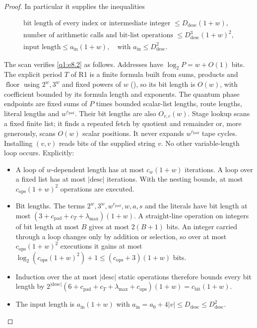 \begin{proof}
In particular it supplies the inequalities

\begin{equation}\label{q1:e8.2}
\begin{gathered}
\text{bit length of every index or intermediate integer }\le  D_{\mathrm{desc}}(1+w), \\ \text{number of arithmetic calls and bit-list operations }\le  D_{\mathrm{desc}}^{3}(1+w)^{2}, \\ \text{input length} \le  a_{\mathrm{in}}(1+w),\quad\text{with } a_{\mathrm{in}}\le D_{\mathrm{desc}}^{2}.
\end{gathered}
\end{equation}

The scan verifies \eqref{q1:e8.2} as follows. Addresses have \(\log _{2} P=w+O(1)\) bits. The explicit period \(T\) of R1 is a finite formula built from sums, products and \(\operatorname{floor}\) using \(2^{w},3^{w}\) and fixed powers of \(w\) (\cite[Section~\ref*{cl:sec:clock} and Appendix~\ref*{cl:sec:constants}]{DMNoise1D2026}), so its bit length is \(O(w)\), with coefficient bounded by its formula length and exponents. The quantum phase endpoints are fixed sums of \(P\) times bounded scalar-list lengths, route lengths, literal lengths and \(w^{c_{\mathrm{pad}}}\). Their bit lengths are also \(O_{v,c}(w)\). Stage lookup scans a fixed finite list; it finds a repeated fetch by quotient and remainder or, more generously, scans \(O(w)\) scalar positions. It never expands \(w^{c_{\mathrm{pad}}}\) tape cycles. Installing \((v,v)\) reads bits of the supplied string \(v\). No other variable-length loop occurs. Explicitly:
\begin{itemize}
\item A loop of \(w\)-dependent length has at most \(c_{w}(1+w)\) iterations. A loop over a fixed list has at most \(|\mathrm{desc}|\) iterations. With the nesting bounds, at most \(c_{\mathrm{ops}}(1+w)^{2}\) operations are executed.
\item Bit lengths. The terms \(2^{w}, 3^{w}, w^{c_{\mathrm{pad}}}, w, a, s\) and the literals have bit length at most \((3+c_{\mathrm{pad}}+c_{T}+\lambda_{\mathrm{max}})(1+w)\). A straight-line operation on integers of bit length at most \(B\) gives at most \(2(B+1)\) bits. An integer carried through a loop changes only by addition or selection, so over at most \(c_{\mathrm{ops}}(1+w)^{2}\) executions it gains at most \(\log _{2}(c_{\mathrm{ops}}(1+w)^{2})+1 \le  (c_{\mathrm{ops}}+3)(1+w)\) bits.
\item Induction over the at most \(|\mathrm{desc}|\) static operations therefore bounds every bit length by \(2^{|\mathrm{desc}|}(6+c_{\mathrm{pad}}+c_{T}+\lambda_{\mathrm{max}}+c_{\mathrm{ops}})(1+w) = c_{\mathrm{bit}}(1+w)\).
\item The input length is \(a_{\mathrm{in}}(1+w)\) with \(a_{\mathrm{in}} = a_{0}+4|v| \le D_{\mathrm{desc}} \le  D_{\mathrm{desc}}^{2}\).
\end{itemize}


\end{proof}
